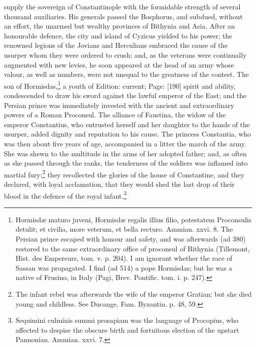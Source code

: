 supply the sovereign of Constantinople with the formidable strength of several thousand auxiliaries. His generals passed the Bosphorus, and subdued, without an effort, the unarmed but wealthy provinces of Bithynia and Asia. After an honourable defence, the city and island of Cyzicus yielded to his power; the renowned legions of the Jovians and Herculians embraced the cause of the usurper whom they were ordered to crush; and, as the veterans were continually augmented with new levies, he soon appeared at the head of an army whose valour, as well as numbers, were not unequal to the greatness of the contest. The son of Hormisdas,\footnote{Hormisdæ maturo juveni, Hormisdæ regalis illius filio, potestatem Proconsulis detulit; et civilia, more veterum, et bella recturo. Ammian. xxvi. 8. The Persian prince escaped with honour and safety, and was afterwards (ad 380) restored to the same extraordinary office of proconsul of Bithynia (Tillemont, Hist. des Empereurs, tom. v. p. 204). I am ignorant whether the race of Sassan was propagated. I find (ad 514) a pope Hormisdas; but he was a native of Frusino, in Italy (Pagi, Brev. Pontific. tom. i. p. 247).} a youth of Edition: current; Page: [190] spirit and ability, condescended to draw his sword against the lawful emperor of the East; and the Persian prince was immediately invested with the ancient and extraordinary powers of a Roman Proconsul. The alliance of Faustina, the widow of the emperor Constantius, who entrusted herself and her daughter to the hands of the usurper, added dignity and reputation to his cause. The princess Constantia, who was then about five years of age, accompanied in a litter the march of the army. She was shewn to the multitude in the arms of her adopted father; and, as often as she passed through the ranks, the tenderness of the soldiers was inflamed into martial fury:\footnote{The infant rebel was afterwards the wife of the emperor Gratian; but she died young and childless. See Ducange, Fam. Byzantin. p. 48, 59.} they recollected the glories of the house of Constantine, and they declared, with loyal acclamation, that they would shed the last drop of their blood in the defence of the royal infant.\footnote{Sequimini culminis summi prosapiam was the language of Procopius, who affected to despise the obscure birth and fortuitous election of the upstart Pannonian. Ammian. xxvi. 7.}

